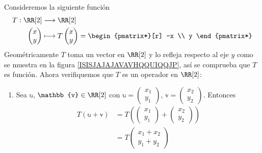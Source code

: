 \begin{examplebox}{}{}
    Consideremos la siguiente función
    \begin{align*}
        T: \RR[2] & \longrightarrow \RR[2] \\
        \begin{pmatrix}
            x \\
            y
        \end{pmatrix} & \longmapsto T \begin{pmatrix}
            x \\
            y
        \end{pmatrix} = \begin{pmatrix*}[r]
            -x \\
            y
        \end{pmatrix*}
    \end{align*}
    Geométricamente $T$ toma un vector en $\RR[2]$ y lo refleja respecto al eje $y$ como se muestra en la figura \ref{ISISJAJAJAVAVHQQUIQQJP}, así se comprueba que $T$ es función. Ahora verifiquemos que $T$ es un operador en $\RR[2]$:
    \begin{enumerate}[label=\roman*), topsep=6pt, itemsep=0pt]
        \item Sea $\mathbb{u}$, $\mathbb{v} \in \RR[2]$ con $\mathbb{u} = \begin{pmatrix}
            x_1 \\
            y_1
        \end{pmatrix}$, $\mathbb{v} = \begin{pmatrix}
            x_2 \\
            y_2
        \end{pmatrix}$. Entonces
        \begin{align*}
            T(\mathbb{u} + \mathbb{v}) & = T\left( \begin{pmatrix}
                x_1 \\
                y_1
            \end{pmatrix} + \begin{pmatrix}
                x_2 \\
                y_2
            \end{pmatrix} \right) \\
            & = T \begin{pmatrix}
                x_1 + x_2 \\
                y_1 + y_2
            \end{pmatrix} \\

\end{align*}
\end{enumerate}
\end{examplebox}
